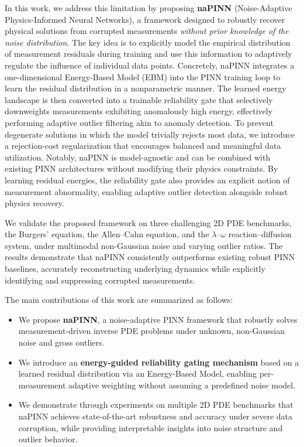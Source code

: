 \documentclass{article}
\theoremstyle{plain}
\theoremstyle{definition}
\theoremstyle{remark}
\begin{document}
In this work, we address this limitation by proposing \textbf{naPINN} (Noise-Adaptive Physics-Informed Neural Networks), a framework designed to robustly recover physical solutions from corrupted measurements \emph{without prior knowledge of the noise distribution}. The key idea is to explicitly model the empirical distribution of measurement residuals during training and use this information to adaptively regulate the influence of individual data points. Concretely, naPINN integrates a one-dimensional Energy-Based Model (EBM) \cite{LeCun2006} into the PINN training loop to learn the residual distribution in a nonparametric manner. The learned energy landscape is then converted into a trainable reliability gate that selectively downweights measurements exhibiting anomalously high energy, effectively performing adaptive outlier filtering akin to anomaly detection. To prevent degenerate solutions in which the model trivially rejects most data, we introduce a rejection-cost regularization that encourages balanced and meaningful data utilization. Notably, naPINN is model-agnostic and can be combined with existing PINN architectures without modifying their physics constraints. By learning residual energies, the reliability gate also provides an explicit notion of measurement abnormality, enabling adaptive outlier detection alongside robust physics recovery.

We validate the proposed framework on three challenging 2D PDE benchmarks, the Burgers' equation, the Allen–Cahn equation, and the $\lambda$–$\omega$ reaction–diffusion system, under multimodal non-Gaussian noise and varying outlier ratios. The results demonstrate that naPINN consistently outperforms existing robust PINN baselines, accurately reconstructing underlying dynamics while explicitly identifying and suppressing corrupted measurements.

The main contributions of this work are summarized as follows:
\begin{itemize}
    \item We propose \textbf{naPINN}, a noise-adaptive PINN framework that robustly solves measurement-driven inverse PDE problems under unknown, non-Gaussian noise and gross outliers.
    \item We introduce an \textbf{energy-guided reliability gating mechanism} based on a learned residual distribution via an Energy-Based Model, enabling per-measurement adaptive weighting without assuming a predefined noise model.
    \item We demonstrate through experiments on multiple 2D PDE benchmarks that naPINN achieves state-of-the-art robustness and accuracy under severe data corruption, while providing interpretable insights into noise structure and outlier behavior.
\end{itemize}
\end{document}
